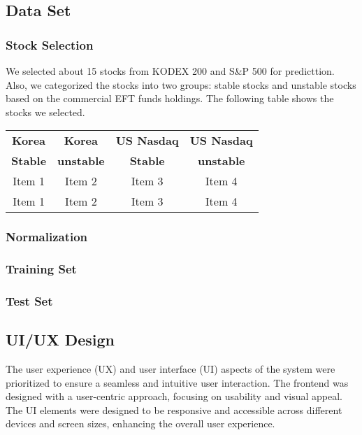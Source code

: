 \subsection{Data Set}
\subsubsection{Stock Selection}

We selected about 15 stocks from KODEX 200 and S\&P 500 for predicttion. 
Also, we categorized the stocks into two groups: stable stocks and unstable stocks based on the commercial EFT funds holdings.
The following table shows the stocks we selected.


\begin{table}[h]
	\label{tab:example}

	\centering
	\begin{tabular}{cccc}
	\toprule\toprule
	\textbf{Korea} & \textbf{Korea} & \textbf{US Nasdaq} & \textbf{US Nasdaq} \\ 
	\textbf{Stable} & \textbf{unstable} & \textbf{Stable} & \textbf{unstable} \\ 
	\midrule
	Item 1 & Item 2 & Item 3 & Item 4 \\
	Item 1 & Item 2 & Item 3 & Item 4\\
	\bottomrule
	\end{tabular}
\end{table}

\subsubsection{Normalization}



\subsubsection{Training Set}



\subsubsection{Test Set}




\subsection{UI/UX Design}
The user experience (UX) and user interface (UI) aspects of the system were prioritized to ensure a seamless and intuitive user interaction. 
The frontend was designed with a user-centric approach, focusing on usability and visual appeal.
The UI elements were designed to be responsive and accessible across different devices and screen sizes, enhancing the overall user experience.

